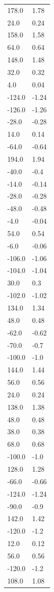\begin{longtable}{ll}
178.0 & 1.78 \\
24.0 & 0.24 \\
158.0 & 1.58 \\
64.0 & 0.64 \\
148.0 & 1.48 \\
32.0 & 0.32 \\
4.0 & 0.04 \\
-124.0 & -1.24 \\
-126.0 & -1.26 \\
-28.0 & -0.28 \\
14.0 & 0.14 \\
-64.0 & -0.64 \\
194.0 & 1.94 \\
-40.0 & -0.4 \\
-14.0 & -0.14 \\
-28.0 & -0.28 \\
-48.0 & -0.48 \\
-4.0 & -0.04 \\
54.0 & 0.54 \\
-6.0 & -0.06 \\
-106.0 & -1.06 \\
-104.0 & -1.04 \\
30.0 & 0.3 \\
-102.0 & -1.02 \\
134.0 & 1.34 \\
48.0 & 0.48 \\
-62.0 & -0.62 \\
-70.0 & -0.7 \\
-100.0 & -1.0 \\
144.0 & 1.44 \\
56.0 & 0.56 \\
24.0 & 0.24 \\
138.0 & 1.38 \\
48.0 & 0.48 \\
38.0 & 0.38 \\
68.0 & 0.68 \\
-100.0 & -1.0 \\
128.0 & 1.28 \\
-66.0 & -0.66 \\
-124.0 & -1.24 \\
-90.0 & -0.9 \\
142.0 & 1.42 \\
-120.0 & -1.2 \\
12.0 & 0.12 \\
56.0 & 0.56 \\
-120.0 & -1.2 \\
108.0 & 1.08 \\

\end{longtable}
